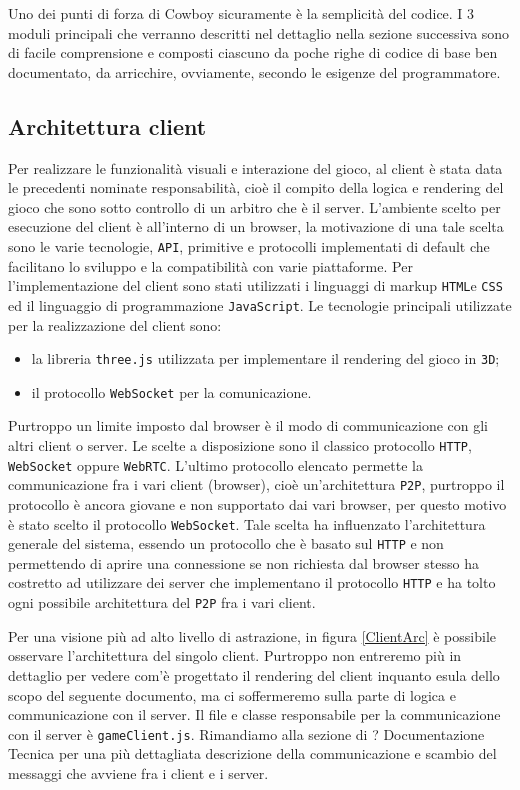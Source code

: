 \documentclass[paper=a4, fontsize=11pt]{scrartcl} %
\numberwithin{equation}{section} %
\numberwithin{figure}{section} %
\numberwithin{table}{section} %
\begin{document}
Uno dei punti di forza di Cowboy sicuramente è la semplicità del codice. I 3 moduli principali che verranno descritti nel dettaglio nella sezione successiva sono di facile comprensione e composti ciascuno da poche righe di codice di base ben documentato, da arricchire, ovviamente, secondo le esigenze del programmatore.

\subsection{Architettura client}
Per realizzare le funzionalità visuali e interazione del gioco, al client è stata data le precedenti nominate responsabilità, cioè il compito della logica e rendering del gioco che sono sotto controllo di un arbitro che è il server.
L'ambiente scelto per esecuzione del client è all'interno di un browser, la motivazione di una tale scelta sono le varie tecnologie, \texttt{API}, primitive e protocolli
implementati di default che facilitano lo sviluppo e la compatibilità con varie piattaforme.
Per l'implementazione del client sono stati utilizzati i linguaggi di markup \texttt{HTML}e \texttt{CSS} ed il linguaggio di programmazione \texttt{JavaScript}.
Le tecnologie principali utilizzate per la realizzazione del client sono:
\begin{itemize}
\item la libreria \texttt{three.js} \cite{threejs} utilizzata per implementare il rendering del gioco in \texttt{3D};
\item il protocollo \texttt{WebSocket} \cite{websocket} per la comunicazione.
\end{itemize}

Purtroppo un limite imposto dal browser è il modo di communicazione con gli altri client o server. Le scelte a disposizione sono il classico protocollo \texttt{HTTP}, \texttt{WebSocket} oppure \texttt{WebRTC}. L'ultimo protocollo elencato permette la communicazione fra i vari client (browser), cioè un'architettura \texttt{P2P}, purtroppo il
protocollo è ancora giovane e non supportato dai vari browser, per questo motivo è stato scelto il protocollo \texttt{WebSocket}. Tale scelta ha influenzato l'architettura
generale del sistema, essendo un protocollo che è basato sul \texttt{HTTP} e non permettendo di aprire una connessione se non richiesta dal browser stesso ha costretto
ad utilizzare dei server che implementano il protocollo \texttt{HTTP} e ha tolto ogni possibile architettura del \texttt{P2P} fra i vari client.


Per una visione più ad alto livello di astrazione, in figura \ref{ClientArc} è possibile osservare l'architettura del singolo client.
Purtroppo non entreremo più in dettaglio per vedere com'è progettato il rendering del client inquanto esula dello scopo del seguente documento, 
ma ci soffermeremo sulla parte di logica e communicazione con il server. Il file e classe responsabile per la communicazione con il server è \texttt{gameClient.js}.
Rimandiamo alla sezione di ? Documentazione Tecnica per una più dettagliata descrizione della communicazione e scambio del messaggi che avviene fra i client e i server.
\end{document}
